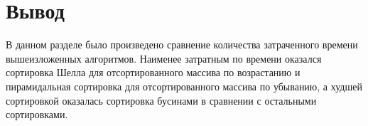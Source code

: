 \section{Вывод}
В данном разделе было произведено сравнение количества затраченного времени вышеизложенных алгоритмов. Наименее затратным по времени оказался сортировка Шелла для отсортированного массива по возрастанию и пирамидальная сортировка для отсортированного массива по убыванию, а худшей сортировкой оказалась сортировка бусинами в сравнении с остальными сортировками.
